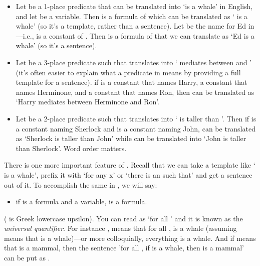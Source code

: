 \begin{itemize}
 
 \item Let  be a 1-place predicate that can be translated into `is a whale' 
  in English, and let  be a variable.  Then  is a formula of \lL[Q]{} 
  which can be translated as ` is a whale' (so it's a template, rather than 
  a sentence). Let  be the name for Ed in \lL[Q]{}
---i.e.,  is a constant of \lL[Q]{}. Then  is a formula of \lL[Q]{} 
that we can translate as `Ed is a whale' (so it's a sentence). 

\item Let  be a 3-place predicate  such that  translates into 
 ` mediates between  and ' (it's often easier to explain what a 
 predicate in \lL[Q]{} means by providing a full template for a sentence). if 
  is a constant that names Harry,  a constant that names Herminone, 
 and  a constant that names Ron, then  can be translated as 
 `Harry mediates between Herminone and Ron'.

\item Let  be a 2-place predicate such that  translates into ` 
 is taller than '. Then if  is a constant naming Sherlock and  is 
 a constant naming John,  can be translated as `Sherlock is taller than 
 John' while  can be translated into `John is taller than Sherlock'. Word 
 order matters.

 \end{itemize}
 
 
 There is one more important feature of \lL[Q].  Recall that we can take a 
 template like ` is a whale', prefix it with `for any x' or `there is an 
   such that' and get a sentence out of it. To accomplish the same in 
 \lL[Q], we will say:

\begin{itemize}

 \item if \p{\phi} is a formula and \p{\upsilon} a variable,  
  \p{\lforall\upsilon\phi} is a formula.

\end{itemize}

(\p{\upsilon} is Greek lowercase upsilon). You can read \p{\lforall\upsilon} as 
`for all \p{\upsilon}' and it is known as the
\emph{universal quantifier}. For instance ,  means that for all 
,  is a whale (assuming  means that  is a whale)---or more 
colloquially, everything is a whale.  And if  means that  is a mammal, 
then the sentence 'for all , if  is a whale, then  is a mammal' 
can be put as .

